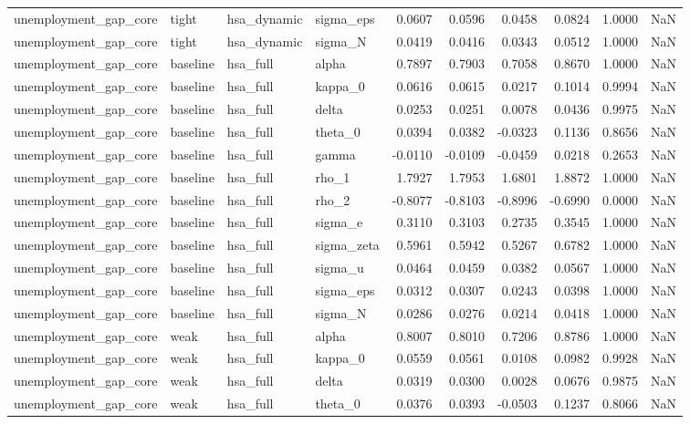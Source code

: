 \begin{tabular}{llllrrrrrl}
unemployment\_gap\_core & tight & hsa\_dynamic & sigma\_eps & 0.0607 & 0.0596 & 0.0458 & 0.0824 & 1.0000 & NaN \\
unemployment\_gap\_core & tight & hsa\_dynamic & sigma\_N & 0.0419 & 0.0416 & 0.0343 & 0.0512 & 1.0000 & NaN \\
unemployment\_gap\_core & baseline & hsa\_full & alpha & 0.7897 & 0.7903 & 0.7058 & 0.8670 & 1.0000 & NaN \\
unemployment\_gap\_core & baseline & hsa\_full & kappa\_0 & 0.0616 & 0.0615 & 0.0217 & 0.1014 & 0.9994 & NaN \\
unemployment\_gap\_core & baseline & hsa\_full & delta & 0.0253 & 0.0251 & 0.0078 & 0.0436 & 0.9975 & NaN \\
unemployment\_gap\_core & baseline & hsa\_full & theta\_0 & 0.0394 & 0.0382 & -0.0323 & 0.1136 & 0.8656 & NaN \\
unemployment\_gap\_core & baseline & hsa\_full & gamma & -0.0110 & -0.0109 & -0.0459 & 0.0218 & 0.2653 & NaN \\
unemployment\_gap\_core & baseline & hsa\_full & rho\_1 & 1.7927 & 1.7953 & 1.6801 & 1.8872 & 1.0000 & NaN \\
unemployment\_gap\_core & baseline & hsa\_full & rho\_2 & -0.8077 & -0.8103 & -0.8996 & -0.6990 & 0.0000 & NaN \\
unemployment\_gap\_core & baseline & hsa\_full & sigma\_e & 0.3110 & 0.3103 & 0.2735 & 0.3545 & 1.0000 & NaN \\
unemployment\_gap\_core & baseline & hsa\_full & sigma\_zeta & 0.5961 & 0.5942 & 0.5267 & 0.6782 & 1.0000 & NaN \\
unemployment\_gap\_core & baseline & hsa\_full & sigma\_u & 0.0464 & 0.0459 & 0.0382 & 0.0567 & 1.0000 & NaN \\
unemployment\_gap\_core & baseline & hsa\_full & sigma\_eps & 0.0312 & 0.0307 & 0.0243 & 0.0398 & 1.0000 & NaN \\
unemployment\_gap\_core & baseline & hsa\_full & sigma\_N & 0.0286 & 0.0276 & 0.0214 & 0.0418 & 1.0000 & NaN \\
unemployment\_gap\_core & weak & hsa\_full & alpha & 0.8007 & 0.8010 & 0.7206 & 0.8786 & 1.0000 & NaN \\
unemployment\_gap\_core & weak & hsa\_full & kappa\_0 & 0.0559 & 0.0561 & 0.0108 & 0.0982 & 0.9928 & NaN \\
unemployment\_gap\_core & weak & hsa\_full & delta & 0.0319 & 0.0300 & 0.0028 & 0.0676 & 0.9875 & NaN \\
unemployment\_gap\_core & weak & hsa\_full & theta\_0 & 0.0376 & 0.0393 & -0.0503 & 0.1237 & 0.8066 & NaN \\

\end{tabular}
